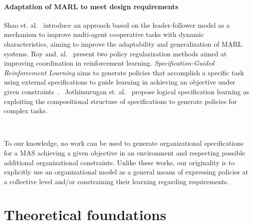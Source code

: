 \documentclass[runningheads]{llncs}
\begin{document}
\paragraph{\textbf{Adaptation of MARL to meet design requirements}}
%
Shao et. al.~\cite{Shao2022} introduce an approach based on the leader-follower model as a mechanism to improve multi-agent cooperative tasks with dynamic characteristics, aiming to improve the adaptability and generalization of MARL systems.
%
Roy and. al.~\cite{Roy2020} present two policy regularization methods aimed at improving coordination in reinforcement learning.
\emph{Specification-Guided Reinforcement Learning} aims to generate policies that accomplish a specific task using external specifications to guide learning in achieving an objective under given constraints~\cite{Bansal2022}.%
%
~Jothimurugan et. al.~\cite{Jothimurugan2021} propose logical specification learning as exploiting the compositional structure of specifications to generate policies for complex tasks.

\

To our knowledge, no work can be used to generate organizational specifications for a MAS achieving a given objective in an environment and respecting possible additional organizational constraints.
Unlike these works, our originality is to explicitly use an organizational model as a general means of expressing policies at a collective level and/or constraining their learning regarding requirements.



\section{Theoretical foundations}




\end{document}
